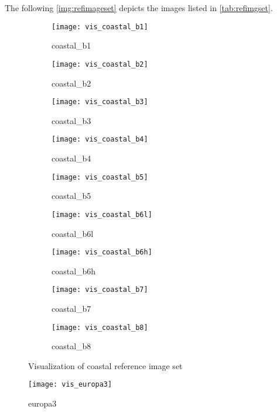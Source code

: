 The following \autoref{img:refimageset} depicts the images listed in \autoref{tab:refimgset}.
\begin{figure}[tb]
  \begin{subfigure}[b]{0.3\textwidth}
    \texttt{[image: vis\_coastal\_b1]}
    \caption{coastal\_b1}
    \label{fig:coastal_b1}
  \end{subfigure}
  \quad
  \begin{subfigure}[b]{0.3\textwidth}
    \texttt{[image: vis\_coastal\_b2]}
    \caption{coastal\_b2}
    \label{fig:coastal_b2}
  \end{subfigure}
  \quad
  \begin{subfigure}[b]{0.3\textwidth}
    \texttt{[image: vis\_coastal\_b3]}
    \caption{coastal\_b3}
    \label{fig:coastal_b3}
  \end{subfigure}
  \begin{subfigure}[b]{0.3\textwidth}
    \texttt{[image: vis\_coastal\_b4]}
    \caption{coastal\_b4}
    \label{fig:coastal_b4}
  \end{subfigure}
  \quad
  \begin{subfigure}[b]{0.3\textwidth}
    \texttt{[image: vis\_coastal\_b5]}
    \caption{coastal\_b5}
    \label{fig:coastal_b5}
  \end{subfigure}
  \quad
  \begin{subfigure}[b]{0.3\textwidth}
    \texttt{[image: vis\_coastal\_b6l]}
    \caption{coastal\_b6l}
    \label{fig:coastal_b6l}
  \end{subfigure}
  \begin{subfigure}[b]{0.3\textwidth}
    \texttt{[image: vis\_coastal\_b6h]}
    \caption{coastal\_b6h}
    \label{fig:coastal_b6h}
  \end{subfigure}
  \quad
  \begin{subfigure}[b]{0.3\textwidth}
    \texttt{[image: vis\_coastal\_b7]}
    \caption{coastal\_b7}
    \label{fig:coastal_b7}
  \end{subfigure}
  \quad
  \begin{subfigure}[b]{0.3\textwidth}
    \texttt{[image: vis\_coastal\_b8]}
    \caption{coastal\_b8}
    \label{fig:coastal_b8}
  \end{subfigure}
\caption{Visualization of coastal reference image set}
\label{img:refimgcoastal}
\end{figure}

\begin{figure}[h]
    \texttt{[image: vis\_europa3]}
    \caption{europa3}
    \label{fig:europa3}
\end{figure}

